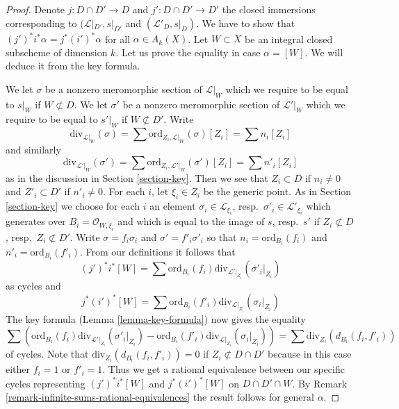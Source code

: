 \begin{proof}
Denote $j : D \cap D' \to D$ and $j' : D \cap D' \to D'$ the closed
immersions corresponding to $(\mathcal{L}|_{D'}, s|_{D'}$ and
$(\mathcal{L}'_D, s|_D)$. We have to show that
$(j')^*i^*\alpha = j^* (i')^*\alpha$ for all $\alpha \in A_k(X)$.
Let $W \subset X$ be an integral closed subscheme of dimension $k$.
Let us prove the equality in case $\alpha = [W]$. We will deduce
it from the key formula.

\medskip\noindent
We let $\sigma$ be a nonzero meromorphic section of $\mathcal{L}|_W$
which we require to be equal to $s|_W$ if $W \not \subset D$.
We let $\sigma'$ be a nonzero meromorphic section of $\mathcal{L}'|_W$
which we require to be equal to $s'|_W$ if $W \not \subset D'$.
Write
$$
\text{div}_{\mathcal{L}|_W}(\sigma) =
\sum \text{ord}_{Z_i, \mathcal{L}|_W}(\sigma)[Z_i] = \sum n_i[Z_i]
$$
and similarly
$$
\text{div}_{\mathcal{L}'|_W}(\sigma') =
\sum \text{ord}_{Z_i, \mathcal{L}'|_W}(\sigma')[Z_i] = \sum n'_i[Z_i]
$$
as in the discussion in Section \ref{section-key}.
Then we see that $Z_i \subset D$ if $n_i \not = 0$ and
$Z'_i \subset D'$ if $n'_i \not = 0$. For each $i$, let $\xi_i \in Z_i$
be the generic point. As in Section \ref{section-key} we choose
for each $i$ an element
$\sigma_i \in \mathcal{L}_{\xi_i}$, resp.\ $\sigma'_i \in \mathcal{L}'_{\xi_i}$
which generates over $B_i = \mathcal{O}_{W, \xi_i}$
and which is equal to the image of
$s$, resp.\ $s'$ if $Z_i \not \subset D$, resp.\ $Z_i \not \subset D'$.
Write $\sigma = f_i \sigma_i$ and $\sigma' = f'_i\sigma'_i$ so that
$n_i = \text{ord}_{B_i}(f_i)$ and
$n'_i = \text{ord}_{B_i}(f'_i)$.
From our definitions it follows that
$$
(j')^*i^*[W] =
\sum \text{ord}_{B_i}(f_i) \text{div}_{\mathcal{L}'|_{Z_i}}(\sigma'_i|_{Z_i})
$$
as cycles and
$$
j^*(i')^*[W] =
\sum \text{ord}_{B_i}(f'_i) \text{div}_{\mathcal{L}|_{Z_i}}(\sigma_i|_{Z_i})
$$
The key formula (Lemma \ref{lemma-key-formula}) now gives the equality
$$
\sum \left(
\text{ord}_{B_i}(f_i) \text{div}_{\mathcal{L}'|_{Z_i}}(\sigma'_i|_{Z_i}) -
\text{ord}_{B_i}(f'_i) \text{div}_{\mathcal{L}|_{Z_i}}(\sigma_i|_{Z_i})
\right) =
\sum \text{div}_{Z_i}(d_{B_i}(f_i, f'_i))
$$
of cycles. Note that $\text{div}_{Z_i}(d_{B_i}(f_i, f'_i)) = 0$ if
$Z_i \not \subset D \cap D'$ because in this case either $f_i = 1$
or $f'_i = 1$. Thus we get a rational equivalence between our specific
cycles representing $(j')^*i^*[W]$ and $j^*(i')^*[W]$ on $D \cap D' \cap W$.
By Remark \ref{remark-infinite-sums-rational-equivalences}
the result follows for general $\alpha$.
\end{proof}







